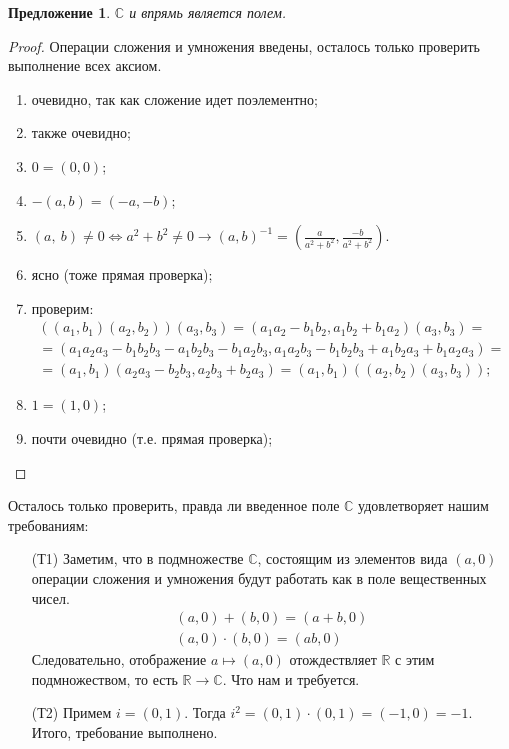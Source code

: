 \documentclass[a4paper,12pt]{article}
\newtheorem{Suggestion}{Предложение}
\begin{document}
	\begin{Suggestion}
		$\mathbb{C}$ и впрямь является полем.
	\end{Suggestion}
	
	\begin{proof}
		Операции сложения и умножения введены, осталось только проверить выполнение всех аксиом.
		\begin{enumerate}
			\item очевидно, так как сложение идет поэлементно;
			\item также очевидно;
			\item $0 = (0, 0)$;
			\item $-(a, b) = (-a, -b)$;
			\item $(a,\ b) \neq 0 \Leftrightarrow a^2 + b^2 \neq 0 \rightarrow (a, b)^{-1} = \left(\frac{a}{a^2 + b^2}, \frac{-b}{a^2 + b^2}\right)$.
			\item ясно (тоже прямая проверка);
			\item проверим:
			\begin{gather*}
			((a_1, b_1) (a_2, b_2)) (a_3, b_3) = (a_1a_2 - b_1b_2, a_1b_2 + b_1a_2) (a_3, b_3) = \\ 
			= (a_1a_2a_3 - b_1b_2b_3 - a_1b_2b_3 - b_1a_2b_3, a_1a_2b_3 - b_1b_2b_3 + a_1b_2a_3 + b_1a_2a_3) = \\
			= (a_1, b_1)  (a_2a_3 - b_2b_3, a_2b_3 + b_2a_3) = (a_1, b_1)((a_2, b_2) (a_3, b_3));
			\end{gather*}
			\item $1 = (1, 0)$;
			\item почти очевидно (т.е. прямая проверка);
		\end{enumerate}
	\end{proof}
	
	Осталось только проверить, правда ли введенное поле $\mathbb{C}$ удовлетворяет нашим требованиям:
	\begin{itemize}
		\item[(Т1)] Заметим, что в подмножестве $\mathbb{C}$, состоящим из элементов вида $(a, 0)$ операции сложения и умножения будут работать как в поле вещественных чисел.
		\begin{gather*}
		(a, 0) + (b, 0) = (a + b, 0) \\
		(a, 0) \cdot (b, 0) = (ab, 0)
		\end{gather*} 
		Следовательно, отображение $a \mapsto (a, 0)$ отождествляет $\mathbb{R}$ с этим подмножеством, то есть $\mathbb{R} \rightarrow \mathbb{C}$. Что нам и требуется.
		\item[(Т2)] Примем $i = (0, 1)$. Тогда $i^2 = (0, 1) \cdot (0, 1) = (-1, 0) = -1$. Итого, требование выполнено.
	\end{itemize}
	
\end{document}
